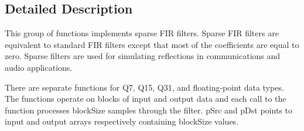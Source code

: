 \subsection{Detailed Description}
This group of functions implements sparse F\+IR filters. Sparse F\+IR filters are equivalent to standard F\+IR filters except that most of the coefficients are equal to zero. Sparse filters are used for simulating reflections in communications and audio applications.

There are separate functions for Q7, Q15, Q31, and floating-\/point data types. The functions operate on blocks of input and output data and each call to the function processes {\ttfamily block\+Size} samples through the filter. {\ttfamily p\+Src} and {\ttfamily p\+Dst} points to input and output arrays respectively containing {\ttfamily block\+Size} values.

